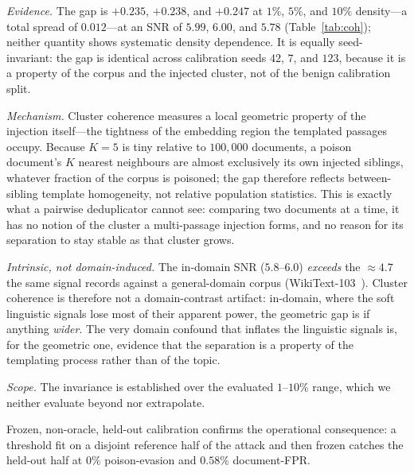 \documentclass[10pt,journal,compsoc]{IEEEtran}
\begin{document}
\emph{Evidence.} The gap is $+0.235$, $+0.238$, and $+0.247$ at $1\%$, $5\%$, and
$10\%$ density---a total spread of $0.012$---at an SNR of $5.99$, $6.00$, and $5.78$
(Table~\ref{tab:coh}); neither quantity shows systematic density dependence. It is
equally seed-invariant: the gap is identical across calibration seeds $42$, $7$, and
$123$, because it is a property of the corpus and the injected cluster, not of the
benign calibration split.

\emph{Mechanism.} Cluster coherence measures a local geometric property of the
injection itself---the tightness of the embedding region the templated passages
occupy. Because $K=5$ is tiny relative to $100{,}000$ documents, a poison document's
$K$ nearest neighbours are almost exclusively its own injected siblings, whatever
fraction of the corpus is poisoned; the gap therefore reflects between-sibling
template homogeneity, not relative population statistics. This is exactly what a
pairwise deduplicator cannot see: comparing two documents at a time, it has no
notion of the cluster a multi-passage injection forms, and no reason for its
separation to stay stable as that cluster grows.

\emph{Intrinsic, not domain-induced.} The in-domain SNR ($5.8$--$6.0$) \emph{exceeds}
the $\approx\!4.7$ the same signal records against a general-domain corpus
(WikiText-103~\cite{wikitext}). Cluster coherence is therefore not a domain-contrast
artifact: in-domain, where the soft linguistic signals lose most of their apparent
power, the geometric gap is if anything \emph{wider}. The
very domain confound that inflates the linguistic signals is, for the geometric one,
evidence that the separation is a property of the templating process rather than of
the topic.

\emph{Scope.} The invariance is established over the evaluated $1$--$10\%$ range,
which we neither evaluate beyond nor extrapolate.

Frozen, non-oracle, held-out calibration confirms the operational consequence: a
threshold fit on a disjoint reference half of the attack and then frozen catches the
held-out half at $0\%$ poison-evasion and $0.58\%$ document-FPR.
\end{document}
